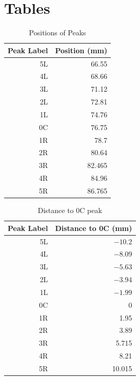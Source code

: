\section{Tables}
\begin{table}[ht!]
	\centering
	\begin{tabular}{|r|r|} \hline
		Peak Label & Position (mm) \\
		\hline
		5L & 66.55 \\
		4L & 68.66 \\
		3L & 71.12 \\
		2L & 72.81 \\
		1L & 74.76 \\
		0C & 76.75 \\
		1R & 78.7 \\
		2R & 80.64 \\
		3R & 82.465 \\
		4R & 84.96 \\
		5R & 86.765 \\
		\hline
	\end{tabular}
	\caption{Positions of Peaks}
	\label{table.pos}
\end{table}
\begin{table}[ht!]
	\centering
	\begin{tabular}{|r|r|} \hline
		Peak Label & Distance to 0C (mm) \\
		\hline
		5L & $-10.2$ \\
		4L & $-8.09$ \\
		3L & $-5.63$ \\
		2L & $-3.94$ \\
		1L & $-1.99$ \\
		0C & 0 \\
		1R & 1.95 \\
		2R & 3.89 \\
		3R & 5.715 \\
		4R & 8.21 \\
		5R & 10.015 \\
		\hline
	\end{tabular}
	\caption{Distance to 0C peak}
	\label{table.disC}
\end{table}
